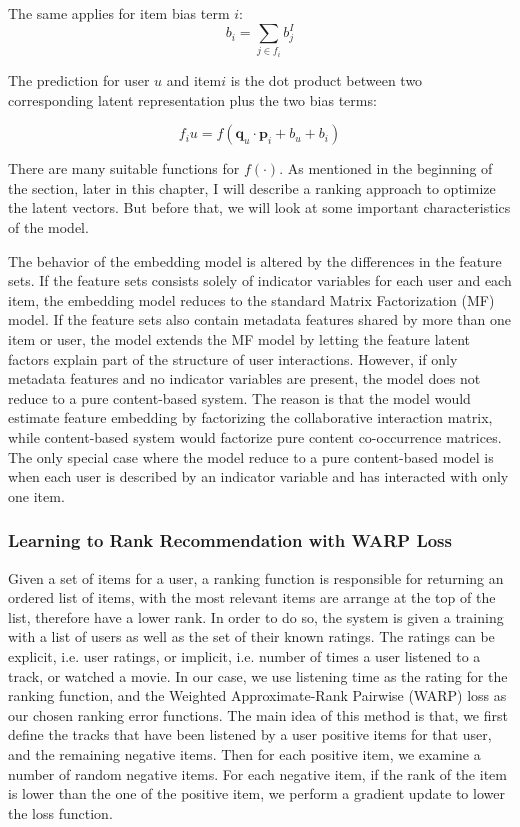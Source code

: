\noindent The same applies for item bias term \(i\):
\begin{displaymath}
b_i = \sum_{j \in f_i} b_j^I
\end{displaymath}

The prediction for user \(u\) and item\(i\) is the dot product between two corresponding latent representation plus the two bias terms:

\begin{displaymath}
f_{i}u = f (\boldsymbol{q}_u  \cdot \boldsymbol{p}_i + b_u + b_i) \tag{2} \label{eq:2}
\end{displaymath}

\noindent There are many suitable functions for  \( f(\cdot)\). As mentioned in the beginning of the section, later in this chapter, I will describe a ranking approach to optimize the latent vectors. But before that, we will look at some important characteristics of the model. 

\noindent The behavior of the embedding model is altered by the differences in the feature sets. If the feature sets consists solely of indicator variables for each user and each item, the embedding model reduces to the standard Matrix Factorization (MF) model. If the feature sets also contain metadata features shared by more than one item or user, the model extends the MF model by letting the feature latent factors explain part of the structure of user interactions. However, if only metadata features and no indicator variables are present, the model does not reduce to a pure content-based system. The reason is that the model would estimate feature embedding by factorizing the collaborative interaction matrix, while content-based system would factorize pure content co-occurrence matrices. The only special case where the model reduce to a pure content-based model is when each user is described by an indicator variable and has interacted with only one item. 

\subsubsection{Learning to Rank Recommendation with WARP Loss}
Given a set of items for a user, a ranking function is responsible for returning an ordered list of items, with the most relevant items are arrange at the top of the list, therefore have a lower rank. In order to do so, the system is given a training with a list of users as well as the set of their known ratings. The ratings can be explicit, i.e. user ratings, or implicit, i.e. number of times a user listened to a track, or watched a movie. In our case, we use listening time as the rating for the ranking function, and the Weighted Approximate-Rank Pairwise (WARP) loss \cite{weston2011wsabie} as our chosen ranking error functions. The main idea of this method is that, we first define the tracks that have been listened by a user positive items for that user, and the remaining negative items. Then for each positive item, we examine a number of random negative items. For each negative item, if the rank of the item is lower than the one of the positive item, we perform a gradient update to lower the loss function. \hfill \break

